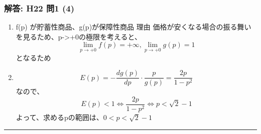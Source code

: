 \documentclass[
]{article}
\providecommand{\tightlist}{%
  \setlength{\itemsep}{0pt}\setlength{\parskip}{0pt}}
\begin{document}
\hypertarget{ux89e3ux7b54-h22-ux554f1-4}{%
\subsubsection{解答: H22 問1 (4)}\label{ux89e3ux7b54-h22-ux554f1-4}}

\begin{enumerate}
\def\labelenumi{\arabic{enumi}.}
\tightlist
\item
  f(p) が貯蓄性商品、g(p)が保障性商品 理由
  価格が安くなる場合の振る舞いを見るため、p-\textgreater+0の極限を考えると、
  \[\lim_{p\to+0}f(p)=+\infty, \lim_{p\to+0}g(p)=1\] となるため
\item
  \[E(p)=-\frac{dg(p)}{dp}\cdot\frac{p}{g(p)}=\frac{2p}{1-p^2}\]なので、
  \[E(p)\lt 1 \Leftrightarrow\frac{2p}{1-p^2}\Leftrightarrow p\lt\sqrt{2}-1\]
  よって、求めるpの範囲は、\(0\lt p \lt \sqrt{2}-1\)
\end{enumerate}

\begin{center}\rule{0.5\linewidth}{0.5pt}\end{center}
\end{document}
